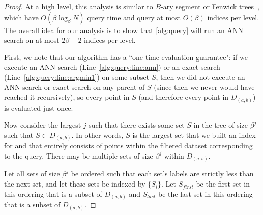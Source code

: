 \documentclass{article}
\theoremstyle{plain}
\theoremstyle{definition}
\theoremstyle{remark}
\newcommand{\julian}[1]{{\color{red}{\bf Julian:} #1}}
\newcommand{\josh}[1]{{\color{orange}{\bf Josh:} #1}}
\begin{document}
\begin{proof}

At a high level, this analysis is similar to $B$-ary segment or Fenwick trees~\cite{pibiri2021practical}, which have $O(\beta \log_\beta N)$ query time and query at most $O(\beta)$ indices per level. The overall idea for our analysis is to show that \cref{alg:query} will run an ANN search on at most $2\beta - 2$ indices per level.

First, we note that our algorithm has a ``one time evaluation guarantee": if we execute an ANN search (Line~\ref{alg:query:line:ann}) or an exact search (Line~\ref{alg:query:line:argmin1}) on some subset $S$, then we did not execute an ANN search or exact search on any parent of $S$ (since then we never would have reached it recursively), so every point in $S$ (and therefore every point in $D_{(a,b)}$) is evaluated just once. 



Now consider the largest $j$ such that there exists some set $S$ in the tree of size $\beta^j$ such that $S \subset D_{(a, b)}$. In other words, $S$ is the largest set that we built an index for and that entirely consists of points within the filtered dataset corresponding to the query. There may be multiple sets of size $\beta^j$ within $D_{(a, b)}$.

Let all sets of size $\beta^j$ be ordered such that each set's labels are strictly less than the next set, and let these sets be indexed by $\{S_i\}$. Let $S_{first}$ be the first set in this ordering that is a subset of $D_{(a,b)}$ and $S_{last}$ be the last set in this ordering that is a subset of $D_{(a, b)}$. 


\end{proof}
\end{document}
